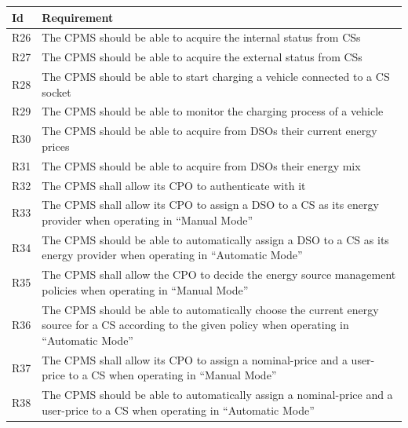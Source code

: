 \documentclass[11pt]{article}
\begin{document}
\begin{table}[H]
    \centering
    \setlength{\tabcolsep}{18pt}
    \renewcommand{\arraystretch}{1.2}
    \begin{tabularx}{\textwidth}{|>{\centering\hsize=0.1\hsize}X|>{\hsize=1.9\hsize}X|}
        \hline
        \textbf{Id} & \textbf{Requirement} \\
        \hline
        R26 & The CPMS should be able to acquire the internal status from CSs \\
        \hline
        R27 & The CPMS should be able to acquire the external status from CSs \\
        \hline
        R28 & The CPMS should be able to start charging a vehicle connected to a CS socket \\
        \hline
        R29 & The CPMS should be able to monitor the charging process of a vehicle \\
        \hline
        R30 & The CPMS should be able to acquire from DSOs their current energy prices \\
        \hline
        R31 & The CPMS should be able to acquire from DSOs their energy mix \\
        \hline
        R32 & The CPMS shall allow its CPO to authenticate with it \\
        \hline
        R33 & The CPMS shall allow its CPO to assign a DSO to a CS as its energy provider  when operating in “Manual Mode” \\
        \hline
        R34 & The CPMS should be able to automatically assign a DSO to a CS as its energy provider when operating in “Automatic Mode” \\
        \hline
        R35 & The CPMS shall allow the CPO to decide the energy source management policies when operating in “Manual Mode” \\
        \hline
        R36 & The CPMS should be able to automatically choose the current energy source for a CS according to the given policy when operating in “Automatic Mode” \\
        \hline
        R37 & The CPMS shall allow its CPO to assign a nominal-price and a user-price to a CS when operating in “Manual Mode” \\
        \hline
        R38 & The CPMS should be able to automatically assign a nominal-price and a user-price to a CS when operating in “Automatic Mode” \\

\end{tabularx}
\end{table}
\end{document}
